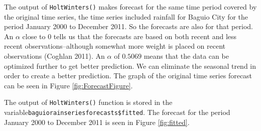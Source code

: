 \documentclass{article}\usepackage{graphicx, color}
\begin{document}
The output of \texttt{HoltWinters()} makes forecast for the same time period covered by the original time series, the time series included rainfall for Baguio City for the period January 2000 to December 2011. So the forecasts are also for that period. An $\alpha$ close to 0 tells us that the forecasts are based on both recent and less recent observations--although somewhat more weight is placed on recent observations (Coghlan 2011). An $\alpha$ of $0.5069$ means that the data can be optimized further to get better prediction. We can eliminate the seasonal trend in order to create a better prediction. The graph of the original time series forecast can be seen in Figure \eqref{fig:ForecastFigure}.

The output of \texttt{HoltWinters()} function is stored in the variable\newline \texttt{baguiorainseriesforecasts\$fitted}. The forecast for the period January 2000 to December 2011 is seen in Figure \eqref{fig:fitted}.
\end{document}
